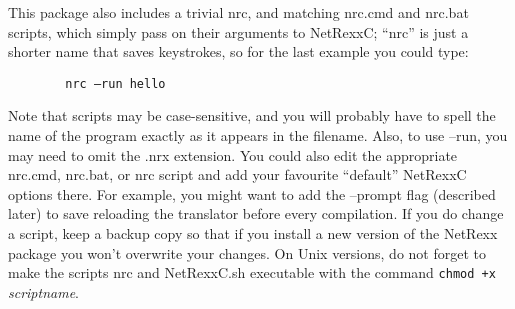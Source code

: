 \begin{enumerate}
\begin{verbatim}
\end{verbatim}
This package also includes a trivial nrc, and matching nrc.cmd and nrc.bat scripts, which simply pass on their arguments to NetRexxC; “nrc” is just a shorter name that saves keystrokes, so for the last example you could type: 
  \begin{verbatim}
        nrc –run hello
\end{verbatim}
Note that scripts may be case-sensitive, and you will probably have to spell the name of the program exactly as it appears in the filename. Also, to use –run, you may need to omit the .nrx extension. 
You could also edit the appropriate nrc.cmd, nrc.bat, or nrc script
and add your favourite “default” NetRexxC options there. For example,
you might want to add the –prompt flag (described later) to save
reloading the translator before every compilation. If you do change a
script, keep a backup copy so that if you install a new version of the
NetRexx package you won’t overwrite your changes. On Unix versions, do
not forget to make the scripts nrc and NetRexxC.sh executable with the
command \texttt{chmod +x} \emph{scriptname}.
\end{enumerate}